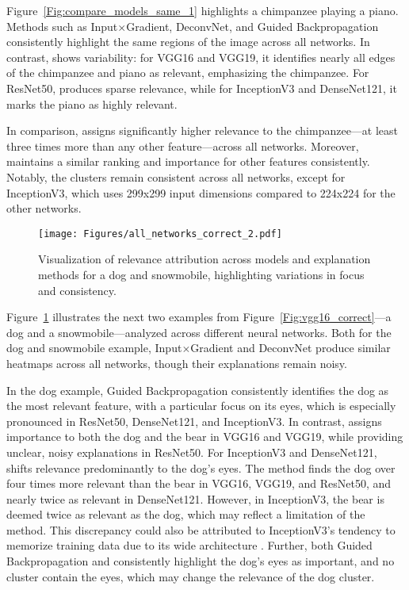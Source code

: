 Figure~\ref{Fig:compare_models_same_1} highlights a chimpanzee playing a piano. Methods such as Input$\times$Gradient, DeconvNet, and Guided Backpropagation consistently highlight the same regions of the image across all networks. In contrast, \LRP\/ shows variability: for VGG16 and VGG19, it identifies nearly all edges of the chimpanzee and piano as relevant, emphasizing the chimpanzee. For ResNet50, \LRP\/ produces sparse relevance, while for InceptionV3 and DenseNet121, it marks the piano as highly relevant.

In comparison, \CTC\/ assigns significantly higher relevance to the chimpanzee—at least three times more than any other feature—across all networks. Moreover, \CTC\/ maintains a similar ranking and importance for other features consistently. Notably, the clusters remain consistent across all networks, except for InceptionV3, which uses 299x299 input dimensions compared to 224x224 for the other networks.



\begin{figure}[ht!]
	\begin{center}
		\texttt{[image: Figures/all\_networks\_correct\_2.pdf]}
	\end{center}
	\caption{Visualization of relevance attribution across models and explanation methods for a dog and snowmobile, highlighting variations in focus and consistency.}
	\label{Fig:compare_models_same_2}
\end{figure} 

Figure~\ref{Fig:compare_models_same_2} illustrates the next two examples from Figure~\ref{Fig:vgg16_correct}—a dog and a snowmobile—analyzed across different neural networks. Both for the dog and snowmobile example, Input$\times$Gradient and DeconvNet produce similar heatmaps across all networks, though their explanations remain noisy.

In the dog example, Guided Backpropagation consistently identifies the dog as the most relevant feature, with a particular focus on its eyes, which is especially pronounced in ResNet50, DenseNet121, and InceptionV3. In contrast, \LRP\/ assigns importance to both the dog and the bear in VGG16 and VGG19, while providing unclear, noisy explanations in ResNet50. For InceptionV3 and DenseNet121, \LRP\/ shifts relevance predominantly to the dog's eyes. The \CTC\/ method finds the dog over four times more relevant than the bear in VGG16, VGG19, and ResNet50, and nearly twice as relevant in DenseNet121. However, in InceptionV3, the bear is deemed twice as relevant as the dog, which may reflect a limitation of the \CTC\/ method. This discrepancy could also be attributed to InceptionV3’s tendency to memorize training data due to its wide architecture \cite{nguyen2020wide}. Further, both Guided Backpropagation and \LRP\/ consistently highlight the dog’s eyes as important, and no \CTC\/ cluster contain the eyes, which may change the relevance of the dog cluster. 

